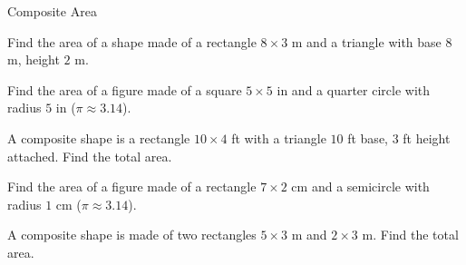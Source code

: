 \begin{practiceBox}{Composite Area}
\resetProblems

\prob Find the area of a shape made of a rectangle $8 \times 3$ m and a triangle with base $8$ m, height $2$ m.

\prob Find the area of a figure made of a square $5 \times 5$ in and a quarter circle with radius $5$ in ($\pi \approx 3.14$).

\prob A composite shape is a rectangle $10 \times 4$ ft with a triangle $10$ ft base, $3$ ft height attached. Find the total area.

\prob Find the area of a figure made of a rectangle $7 \times 2$ cm and a semicircle with radius $1$ cm ($\pi \approx 3.14$).

\prob A composite shape is made of two rectangles $5 \times 3$ m and $2 \times 3$ m. Find the total area.

\end{practiceBox}

